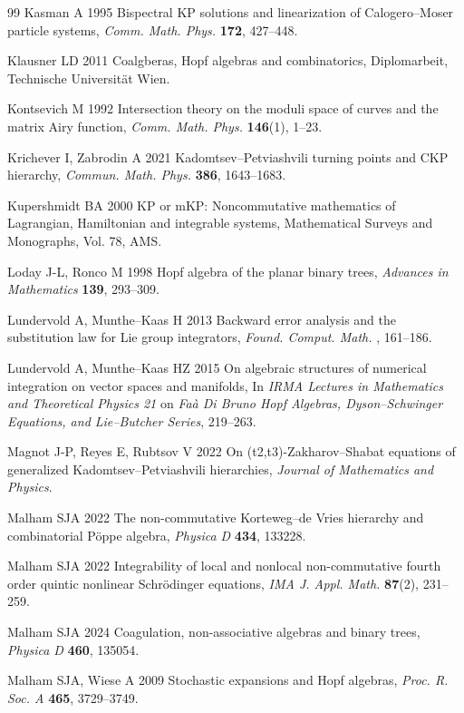 \documentclass[5p,twocolumn]{elsarticle}
\begin{document}
\begin{thebibliography}{99}
 Kasman A 1995 Bispectral KP solutions and linearization of Calogero--Moser particle systems, \textit{Comm. Math. Phys.} \textbf{172}, 427--448.

 Klausner LD 2011 Coalgberas, Hopf algebras and combinatorics, Diplomarbeit, Technische Universit\"at Wien.

 Kontsevich M 1992 Intersection theory on the moduli space of curves and the matrix Airy function, \textit{Comm. Math. Phys.} \textbf{146}(1), 1--23.

 Krichever I, Zabrodin A 2021 Kadomtsev--Petviashvili turning points and CKP hierarchy, \textit{Commun. Math. Phys.\/} \textbf{386}, 1643--1683.
  
 Kupershmidt BA 2000 KP or mKP: Noncommutative mathematics of Lagrangian, Hamiltonian and integrable systems, Mathematical Surveys and Monographs, Vol. 78, AMS.  

 Loday J-L, Ronco M 1998 Hopf algebra of the planar binary trees, \textit{Advances in Mathematics} \textbf{139}, 293--309.

 Lundervold A, Munthe--Kaas H 2013 Backward error analysis and the substitution law for Lie group integrators, \textit{Found. Comput. Math.\/} , 161--186.

 Lundervold A, Munthe--Kaas HZ 2015 On algebraic structures of numerical integration on vector spaces and manifolds, In \textit{IRMA Lectures in Mathematics and Theoretical Physics 21}
  on \textit{Fa\`a Di Bruno Hopf Algebras, Dyson--Schwinger Equations, and Lie--Butcher Series}, 219--263.
  
 Magnot J-P, Reyes E, Rubtsov V 2022 On (t2,t3)-Zakharov--Shabat equations of generalized Kadomtsev--Petviashvili hierarchies, \textit{Journal of Mathematics and Physics}.
  
 Malham SJA 2022 The non-commutative Korteweg--de Vries hierarchy and combinatorial P\"oppe algebra, \textit{Physica D} \textbf{434}, 133228.  

 Malham SJA 2022 Integrability of local and nonlocal non-commutative fourth order quintic nonlinear Schr\"odinger equations, \textit{IMA J. Appl. Math.} \textbf{87}(2), 231--259.

 Malham SJA 2024 Coagulation, non-associative algebras and binary trees, \textit{Physica D} \textbf{460}, 135054.

 Malham SJA, Wiese A 2009 Stochastic expansions and Hopf algebras, \textit{Proc. R. Soc. A} \textbf{465}, 3729--3749.


\end{thebibliography}
\end{document}
